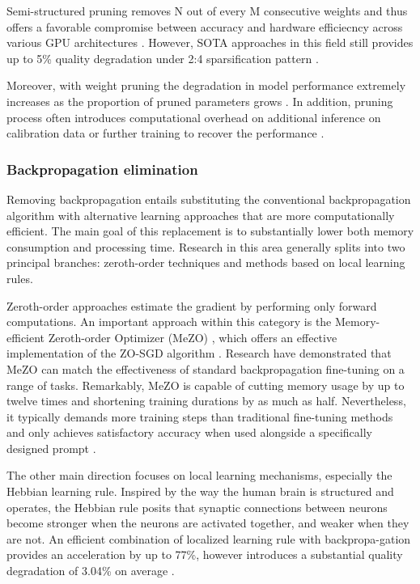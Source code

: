         Semi-structured pruning removes N out of every M consecutive weights and thus offers a favorable compromise between accuracy and hardware efficiecncy across various GPU architectures \cite{huang2024pruninglargelanguagemodels}. However, SOTA approaches in this field still provides up to 5\% quality degradation under 2:4 sparsification pattern \cite{yu2026efficientposttrainingpruninglarge}. 
        
        Moreover, with weight pruning the degradation in model performance extremely increases as the proportion of pruned parameters grows \cite{alanova2026motivatingnextgenacceleratorsflexible}. In addition, pruning process often introduces computational overhead on additional inference on calibration data or further training to recover the \llm{} performance \cite{sun2026maskprolinearspaceprobabilisticlearning}. 

    \subsubsection{Backpropagation elimination}
        Removing backpropagation entails substituting the conventional backpropagation algorithm with alternative learning approaches that are more computationally efficient. The main goal of this replacement is to substantially lower both memory consumption and processing time. Research in this area generally splits into two principal branches: zeroth-order techniques and methods based on local learning rules.

        Zeroth-order approaches estimate the gradient by performing only forward computations. An important approach within this category is the Memory-efficient Zeroth-order Optimizer (MeZO) \cite{mezo}, which offers an effective implementation of the ZO-SGD algorithm \cite{spall}. Research have demonstrated that MeZO can match the effectiveness of standard backpropagation fine-tuning on a range of tasks. Remarkably, MeZO is capable of cutting memory usage by up to twelve times and shortening training durations by as much as half. Nevertheless, it typically demands more training steps than traditional fine-tuning methods and only achieves satisfactory accuracy when used alongside a specifically designed prompt \cite{mezo}.

        The other main direction focuses on local learning mechanisms, especially the Hebbian learning rule. Inspired by the way the human brain is structured and operates, the Hebbian rule \cite{hebb} posits that synaptic connections between neurons become stronger when the neurons are activated together, and weaker when they are not. An efficient combination of localized learning rule with backpropa-gation provides an acceleration by up to 77\%, however introduces a substantial quality degradation of 3.04\% on average \cite{hebb_pricai}.  

